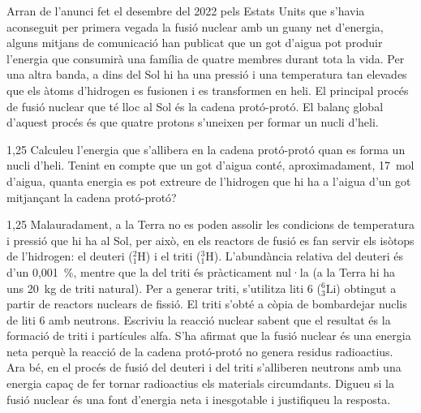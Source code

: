 Arran de l'anunci fet el desembre del 2022 pels Estats Units que s'havia aconseguit per primera vegada la fusió nuclear amb un guany net d'energia, alguns mitjans de comunicació han publicat que un got d'aigua pot produir l'energia que consumirà una família de quatre membres durant tota la vida. Per una altra banda, a dins del Sol hi ha una pressió i una temperatura tan elevades que els àtoms d'hidrogen es fusionen i es transformen en heli. El principal procés de fusió nuclear que té lloc al Sol és la cadena protó-protó. El balanç global d'aquest procés és que quatre protons s'uneixen per formar un nucli d'heli.

\begin{apartat}{1,25}
Calculeu l'energia que s'allibera en la cadena protó-protó quan es forma un nucli d'heli. Tenint en compte que un got d'aigua conté, aproximadament, 17~mol d'aigua, quanta energia es pot extreure de l'hidrogen que hi ha a l'aigua d'un got mitjançant la cadena protó-protó?
\end{apartat}

\begin{apartat}{1,25}
Malauradament, a la Terra no es poden assolir les condicions de temperatura i pressió que hi ha al Sol, per això, en els reactors de fusió es fan servir els isòtops de l'hidrogen: el deuteri (${}^{2}_{1}\mathrm{H}$) i el triti (${}^{3}_{1}\mathrm{H}$). L'abundància relativa del deuteri és d'un 0,001~\%, mentre que la del triti és pràcticament nul·la (a la Terra hi ha uns 20~kg de triti natural).\newline
\hspace*{1.5em}Per a generar triti, s'utilitza liti 6 (${}^{6}_{3}\mathrm{Li}$) obtingut a partir de reactors nuclears de fissió. El triti s'obté a còpia de bombardejar nuclis de liti 6 amb neutrons. Escriviu la reacció nuclear sabent que el resultat és la formació de triti i partícules alfa. S'ha afirmat que la fusió nuclear és una energia neta perquè la reacció de la cadena protó-protó no genera residus radioactius. Ara bé, en el procés de fusió del deuteri i del triti s'alliberen neutrons amb una energia capaç de fer tornar radioactius els materials circumdants. Digueu si la fusió nuclear és una font d'energia neta i inesgotable i justifiqueu la resposta.
\end{apartat}

